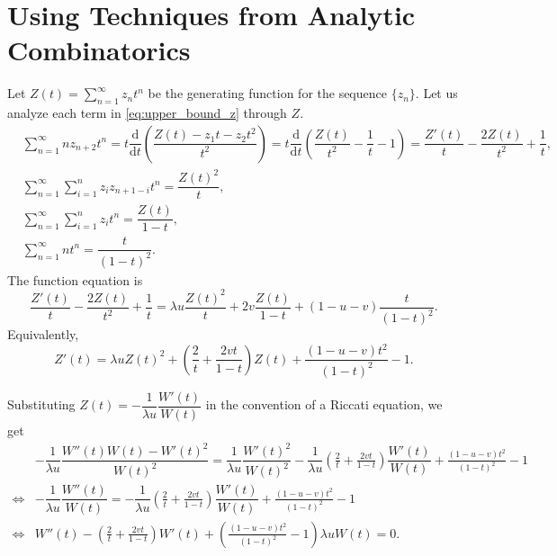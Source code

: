 \section{Using Techniques from Analytic Combinatorics}
Let $Z(t) = \sum_{n=1}^\infty z_n t^n$ be the generating function for the sequence $\{z_n\}$. Let us analyze each term in \eqref{eq:upper_bound_z} through $Z$.
\begin{align*}
   & \sum\limits_{n=1}^\infty nz_{n+2}t^n
  = t\dfrac{\mathrm{d}}{\mathrm{d}t}\left(\dfrac{Z(t) - z_1t - z_2t^2}{t^2}\right) = t\dfrac{\mathrm{d}}{\mathrm{d}t}\left(\dfrac{Z(t)}{t^2} - \dfrac{1}{t} - 1\right) = \dfrac{Z'(t)}{t} - \dfrac{2Z(t)}{t^2} + \dfrac{1}{t}, \\
   & \sum\limits_{n=1}^\infty \sum\limits_{i=1}^n z_iz_{n+1-i}t^n
  = \dfrac{Z(t)^2}{t},                                                                                                                                                                                                         \\
   & \sum\limits_{n=1}^\infty \sum\limits_{i=1}^n z_it^n = \dfrac{Z(t)}{1-t},                                                                                                                                                  \\
   & \sum\limits_{n=1}^\infty nt^n = \dfrac{t}{(1-t)^2}.
\end{align*}
The function equation is
$$\dfrac{Z'(t)}{t} - \dfrac{2Z(t)}{t^2} + \dfrac{1}{t} = \lambda u\dfrac{Z(t)^2}{t} + 2v\dfrac{Z(t)}{1-t} + (1-u-v)\dfrac{t}{(1-t)^2}.$$
Equivalently,
\begin{equation}
  Z'(t) = \lambda u Z(t)^2 + \left( \frac{2}{t} + \frac{2v t}{1-t} \right) Z(t) + \frac{(1-u-v) t^2}{(1-t)^2} - 1.
\end{equation}

Substituting $Z(t) = -\dfrac{1}{\lambda u} \dfrac{W'(t)}{W(t)}$ in the convention of a Riccati equation, we get
\begin{align*}
       & -\dfrac{1}{\lambda u}\dfrac{W''(t)W(t)-W'(t)^2}{W(t)^2} = \dfrac{1}{\lambda u} \dfrac{W'(t)^2}{W(t)^2} - \dfrac{1}{\lambda u} \left( \frac{2}{t} + \frac{2v t}{1-t} \right) \dfrac{W'(t)}{W(t)} + \frac{(1-u-v) t^2}{(1-t)^2} - 1 \\
  \iff & -\dfrac{1}{\lambda u}\dfrac{W''(t)}{W(t)} = - \dfrac{1}{\lambda u} \left( \frac{2}{t} + \frac{2v t}{1-t} \right) \dfrac{W'(t)}{W(t)} + \frac{(1-u-v) t^2}{(1-t)^2} - 1                                                            \\
  \iff & W''(t) - \left( \frac{2}{t} + \frac{2v t}{1-t} \right) W'(t) + \left(\frac{(1-u-v) t^2}{(1-t)^2} - 1\right)\lambda u W(t) = 0.
\end{align*}
